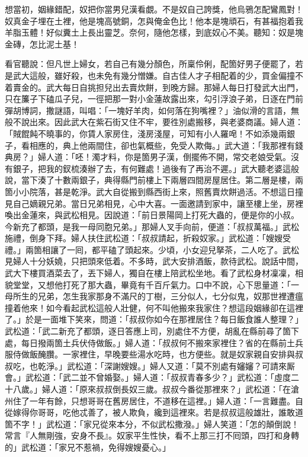\begin{myquote}
想當初，姻緣錯配，奴把你當男兒漢看覷。不是奴自己誇獎，他烏鴉怎配鸞鳳對！奴真金子埋在土裡，他是塊高號銅，怎與俺金色比！他本是塊頑石，有甚福抱着我羊脂玉體！好似糞土上長出靈芝。奈何，隨他怎樣，到底奴心不美。聽知：奴是塊金磚，怎比泥土基！
\end{myquote}

看官聽說：但凡世上婦女，若自己有幾分顏色，所稟伶俐，配箇好男子便罷了，若是武大這般，雖好殺，也未免有幾分憎嫌。{}自古佳人才子相配着的少，買金偏撞不着賣金的。武大每日自挑担兒出去賣炊餅，到晚方歸。那婦人每日打發武大出門，只在簾子下磕瓜子兒，{}一徑把那一對小金蓮故露出來，勾引浮浪子弟，日逐在門前彈胡博詞，撒謎語，叫唱：「一塊好羊肉，如何落在狗嘴裡？」油似滑的言語，無般不說出來。因此武大在紫石街又住不牢，要徃別處搬移，與老婆商議。婦人道：「賊餛飩不曉事的，你賃人家房住，淺房淺屋，可知有小人羅唣！不如添幾兩銀子，看相應的，典上他兩間住，卻也氣概些，免受人欺侮。」武大道：「我那裡有錢典房？」婦人道：「呸！濁才料，你是箇男子漢，倒擺佈不開，常交老娘受氣。沒有銀子，把我的釵梳湊辦了去，有何難處！過後有了再治不遲。」{}武大聽老婆這般說，當下湊了十數兩銀子，典得縣門前樓上下兩層四間房屋居住。第二層是樓，兩箇小小院落，甚是乾淨。武大自從搬到縣西街上來，照舊賣炊餅過活。不想這日撞見自己嫡親兄弟。當日兄弟相見，心中大喜。一面邀請到家中，讓至樓上坐，房裡喚出金蓮來，與武松相見。因說道：「前日景陽岡上打死大蟲的，便是你的小叔。{}今新充了都頭，是我一母同胞兄弟。」{}那婦人叉手向前，便道：「叔叔萬福。」武松施禮，倒身下拜。婦人扶住武松道：「叔叔請起，折殺奴家。」武松道：「嫂嫂受禮。」兩箇相讓了一囘，都平磕了頭起來。少頃，小女迎兒拏茶，二人吃了。武松見婦人十分妖嬈，只把頭來低着。{}不多時，武大安排酒飯，款待武松。說話中間，武大下樓買酒菜去了，丟下婦人，獨自在樓上陪武松坐地。看了武松身材凜凜，相貌堂堂，{}又想他打死了那大蟲，畢竟有千百斤氣力。{}口中不說，心下思量道：「一母所生的兄弟，怎生我家那身不滿尺的丁樹，三分似人，七分似鬼，奴那世裡遭瘟撞着他來！如今看起武松這般人壯健，何不叫他搬來我家住？想這段姻緣卻在這裡了。」{}於是一面堆下笑來，問道：「叔叔你如今在那裡居住？每日飯食誰人整理？」武松道：「武二新充了都頭，逐日答應上司，別處住不方便，胡亂在縣前尋了箇下處，每日撥兩箇土兵伏侍做飯。」婦人道：「叔叔何不搬來家裡住？省的在縣前土兵服侍做飯醃臢。一家裡住，早晚要些湯水吃時，也方便些。就是奴家親自安排與叔叔吃，也乾淨。」武松道：「深謝嫂嫂。」婦人又道：「莫不別處有嬸嬸？{}可請來厮會。」武松道：「武二並不曾婚娶。」婦人道：「叔叔青春多少？」武松道：「虛度二十八歲。」婦人道：「原來叔叔倒長奴三歲。叔叔今番從那裡來？」武松道：「在滄州住了一年有餘，只想哥哥在舊房居住，不道移在這裡。」婦人道：「一言難盡。自從嫁得你哥哥，吃他忒善了，被人欺負，纔到這裡來。若是叔叔這般雄壯，{}誰敢道箇不字！」武松道：「家兄從來本分，不似武松撒潑。」{}婦人笑道：「怎的顛倒說！常言『人無剛強，安身不長』。奴家平生性快，看不上那三打不囘頭，四打和身轉的」武松道：「家兄不惹禍，免得嫂嫂憂心。」

